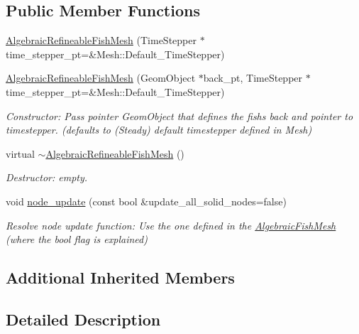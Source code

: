 \subsection*{Public Member Functions}
\begin{DoxyCompactItemize}
\item 
\hyperlink{classoomph_1_1AlgebraicRefineableFishMesh_afe4643b107e47fbad0c8836bc0516518}{Algebraic\+Refineable\+Fish\+Mesh} (Time\+Stepper $\ast$time\+\_\+stepper\+\_\+pt=\&Mesh\+::\+Default\+\_\+\+Time\+Stepper)
\item 
\hyperlink{classoomph_1_1AlgebraicRefineableFishMesh_a04f6b6114c70638b4f26ac6b70f5c0fe}{Algebraic\+Refineable\+Fish\+Mesh} (Geom\+Object $\ast$back\+\_\+pt, Time\+Stepper $\ast$time\+\_\+stepper\+\_\+pt=\&Mesh\+::\+Default\+\_\+\+Time\+Stepper)
\begin{DoxyCompactList}\small\item\em Constructor\+: Pass pointer Geom\+Object that defines the fish\textquotesingle{}s back and pointer to timestepper. (defaults to (Steady) default timestepper defined in Mesh) \end{DoxyCompactList}\item 
virtual \hyperlink{classoomph_1_1AlgebraicRefineableFishMesh_a69145c9bf09e0fbc1a4bffe7bee379cd}{$\sim$\+Algebraic\+Refineable\+Fish\+Mesh} ()
\begin{DoxyCompactList}\small\item\em Destructor\+: empty. \end{DoxyCompactList}\item 
void \hyperlink{classoomph_1_1AlgebraicRefineableFishMesh_a8123da4b48355b39f19e0494a9d4545c}{node\+\_\+update} (const bool \&update\+\_\+all\+\_\+solid\+\_\+nodes=false)
\begin{DoxyCompactList}\small\item\em Resolve node update function\+: Use the one defined in the \hyperlink{classoomph_1_1AlgebraicFishMesh}{Algebraic\+Fish\+Mesh} (where the bool flag is explained) \end{DoxyCompactList}\end{DoxyCompactItemize}
\subsection*{Additional Inherited Members}


\subsection{Detailed Description}

